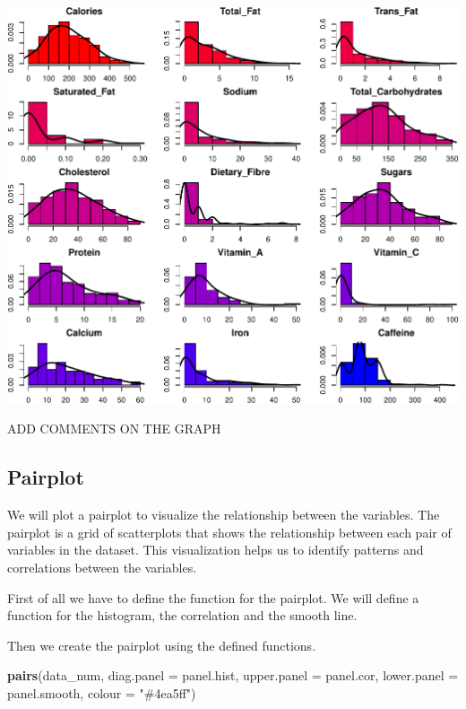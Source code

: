\documentclass[
]{article}
\newenvironment{Shaded}{\begin{snugshade}}{\end{snugshade}}
\newcommand{\AttributeTok}[1]{\textcolor[rgb]{0.13,0.29,0.53}{#1}}
\newcommand{\FunctionTok}[1]{\textcolor[rgb]{0.13,0.29,0.53}{\textbf{#1}}}
\newcommand{\NormalTok}[1]{#1}
\newcommand{\StringTok}[1]{\textcolor[rgb]{0.31,0.60,0.02}{#1}}
\begin{document}
\begin{center}\includegraphics{Statistical_Learning_Final_Report_files/figure-latex/histograms-1} \end{center}

ADD COMMENTS ON THE GRAPH

\subsection{Pairplot}\label{pairplot}

We will plot a pairplot to visualize the relationship between the
variables. The pairplot is a grid of scatterplots that shows the
relationship between each pair of variables in the dataset. This
visualization helps us to identify patterns and correlations between the
variables.

First of all we have to define the function for the pairplot. We will
define a function for the histogram, the correlation and the smooth
line.

Then we create the pairplot using the defined functions.

\begin{Shaded}
\begin{Highlighting}[]
\FunctionTok{pairs}\NormalTok{(data\_num, }
      \AttributeTok{diag.panel =}\NormalTok{ panel.hist,}
      \AttributeTok{upper.panel =}\NormalTok{ panel.cor, }
      \AttributeTok{lower.panel =}\NormalTok{ panel.smooth,}
      \AttributeTok{colour =} \StringTok{"\#4ea5ff"}\NormalTok{)}
\end{Highlighting}
\end{Shaded}
\end{document}
